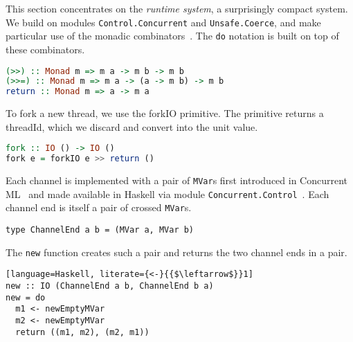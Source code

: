 %
This section concentrates on the \emph{runtime system}, a surprisingly
compact system. We build on modules \lstinline|Control.Concurrent| and
\lstinline|Unsafe.Coerce|, and make particular use of the monadic
combinators~\cite{DBLP:conf/afp/Wadler95}. The \lstinline|do| notation
is built on top of these combinators.
%
\begin{lstlisting}[language=Haskell]
(>>) :: Monad m => m a -> m b -> m b
(>>=) :: Monad m => m a -> (a -> m b) -> m b
return :: Monad m => a -> m a
\end{lstlisting}

To fork a new thread, we use the forkIO primitive. The primitive
returns a threadId, which we discard and convert into the unit value.
%
\begin{lstlisting}[language=Haskell]
fork :: IO () -> IO ()
fork e = forkIO e >> return ()
\end{lstlisting}

Each channel is implemented with a pair of \lstinline|MVar|s first
introduced in Concurrent ML~\cite{DBLP:conf/mcmaster/Reppy93} and made
available in Haskell via module
\lstinline|Concurrent.Control|~\cite{DBLP:conf/popl/JonesGF96}. Each
channel end is itself a pair of crossed \lstinline|MVar|s.
%
\begin{lstlisting}
type ChannelEnd a b = (MVar a, MVar b)
\end{lstlisting}

The \lstinline|new| function creates such a pair and returns the two
channel ends in a pair.
%
\begin{lstlisting}[language=Haskell, literate={<-}{{$\leftarrow$}}1]
new :: IO (ChannelEnd a b, ChannelEnd b a)
new = do
  m1 <- newEmptyMVar
  m2 <- newEmptyMVar
  return ((m1, m2), (m2, m1))
\end{lstlisting}

